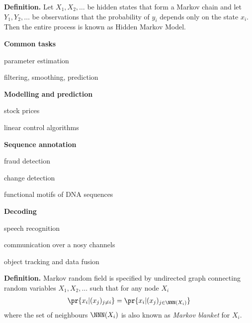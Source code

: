 \documentclass[landscape,footrule]{foils}
\begin{document}

\textbf{Definition.}
Let $X_1,X_2,\ldots$ be hidden states that form a Markov chain and let $Y_1,Y_2,\ldots$ be observations that the probability of $y_i$ depends only on the state $x_i$. Then the entire process is known as Hidden Markov Model.\vspace*{1ex}

\textbf{Common tasks}
\begin{triangles}
\item parameter estimation 
\item filtering, smoothing, prediction
\end{triangles}



\textbf{Modelling and prediction}
\begin{triangles}
\item stock prices
\item linear control algorithms 
\end{triangles}\vspace*{2ex}

\textbf{Sequence annotation}
\begin{triangles}
\item fraud detection
\item change detection 
\item functional motifs of DNA sequences
\end{triangles}\vspace*{2ex}


\textbf{Decoding}
\begin{triangles}
\item speech recognition
\item communication over a nosy channels 
\item object tracking and data fusion
\end{triangles}




\textbf{Definition.}
Markov random field is specified by undirected graph connecting random variables $X_1,X_2,\ldots$ such that for any node $X_i$ 
\begin{align*}
\pr{x_i|(x_j)_{j\neq i}}=\pr{x_i| (x_j)_{j\in\NNN(X_i)} }
\end{align*}
where the set of neighbours $\NNN(X_i)$ is also known as \emph{Markov blanket} for $X_i$. 
\end{document}
